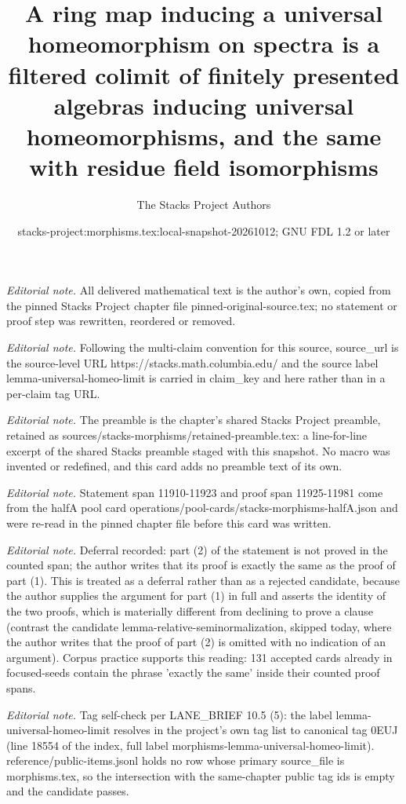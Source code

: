 \documentclass[10pt,a4paper]{amsart}
\title{A ring map inducing a universal homeomorphism on spectra is a filtered colimit of finitely presented algebras inducing universal homeomorphisms, and the same with residue field isomorphisms}
\author{The Stacks Project Authors}
\date{stacks-project:morphisms.tex:local-snapshot-20261012; GNU FDL 1.2 or later}
\theoremstyle{plain}
\theoremstyle{definition}
\theoremstyle{remark}
\numberwithin{equation}{subsection}
\begin{document}
\maketitle
\noindent\textit{Editorial note.} All delivered mathematical text is the author's own, copied from the pinned Stacks Project chapter file pinned-original-source.tex; no statement or proof step was rewritten, reordered or removed.\par\medskip
\noindent\textit{Editorial note.} Following the multi-claim convention for this source, source\_url is the source-level URL https://stacks.math.columbia.edu/ and the source label lemma-universal-homeo-limit is carried in claim\_key and here rather than in a per-claim tag URL.\par\medskip
\noindent\textit{Editorial note.} The preamble is the chapter's shared Stacks Project preamble, retained as sources/stacks-morphisms/retained-preamble.tex: a line-for-line excerpt of the shared Stacks preamble staged with this snapshot. No macro was invented or redefined, and this card adds no preamble text of its own.\par\medskip
\noindent\textit{Editorial note.} Statement span 11910-11923 and proof span 11925-11981 come from the halfA pool card operations/pool-cards/stacks-morphisms-halfA.json and were re-read in the pinned chapter file before this card was written.\par\medskip
\noindent\textit{Editorial note.} Deferral recorded: part (2) of the statement is not proved in the counted span; the author writes that its proof is exactly the same as the proof of part (1). This is treated as a deferral rather than as a rejected candidate, because the author supplies the argument for part (1) in full and asserts the identity of the two proofs, which is materially different from declining to prove a clause (contrast the candidate lemma-relative-seminormalization, skipped today, where the author writes that the proof of part (2) is omitted with no indication of an argument). Corpus practice supports this reading: 131 accepted cards already in focused-seeds contain the phrase 'exactly the same' inside their counted proof spans.\par\medskip
\noindent\textit{Editorial note.} Tag self-check per LANE\_BRIEF 10.5 (5): the label lemma-universal-homeo-limit resolves in the project's own tag list to canonical tag 0EUJ (line 18554 of the index, full label morphisms-lemma-universal-homeo-limit). reference/public-items.jsonl holds no row whose primary source\_file is morphisms.tex, so the intersection with the same-chapter public tag ids is empty and the candidate passes.\par\medskip
\end{document}

